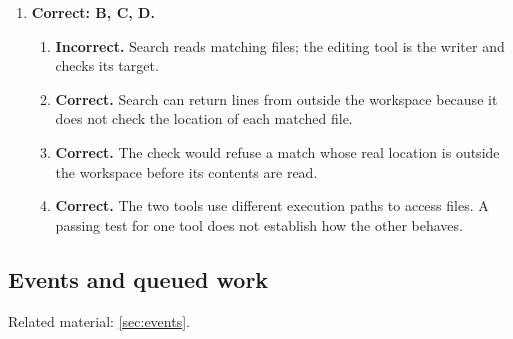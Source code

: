 \begin{enumerate}[start=31,itemsep=0.7\baselineskip]
\item[{\hyperref[exercise:40]{40.}}] \begin{minipage}[t]{\linewidth}
\textbf{Correct: B, C, D.}
\begin{enumerate}[label=\textnormal{(\Alph*)},leftmargin=*,itemsep=0pt]
\item \textbf{Incorrect.} Search reads matching files; the editing tool is the writer and checks its target.
\item \textbf{Correct.} Search can return lines from outside the workspace because it does not check the location of each matched file.
\item \textbf{Correct.} The check would refuse a match whose real location is outside the workspace before its contents are read.
\item \textbf{Correct.} The two tools use different execution paths to access files. A passing test for one tool does not establish how the other behaves.
\end{enumerate}
\end{minipage}

\end{enumerate}

\subsection{Events and queued work}
\noindent Related material: \cref{sec:events}.

